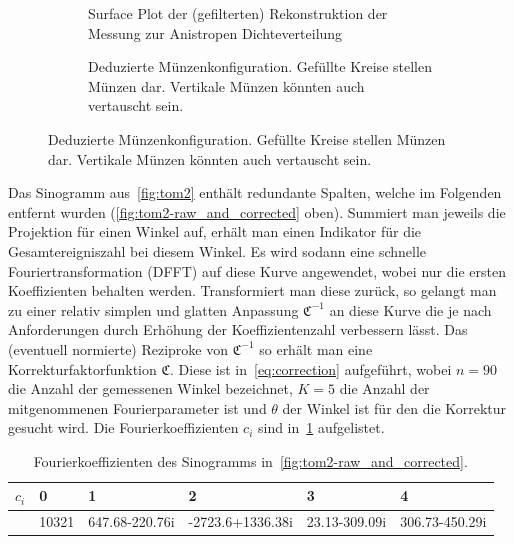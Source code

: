 \documentclass[slug=PET, room=Andreas-Schubert-Bau\,\ 424A,
supervisor=Carsten\ Bittrich, coursedate=10.\ 01.\ 2020, ngerman]{../../Lab_Report_LaTeX/lab_report}
\begin{document}
\begin{figure}[h]
 \centering
 \begin{subfigure}{.4\textwidth}
   \centering
   \resizebox{0.8\textwidth}{!}{
     
   }
   \caption{Surface Plot der (gefilterten) Rekonstruktion der Messung zur Anistropen Dichteverteilung}
   \label{fig:tom2-3dplot}
 \end{subfigure}
 \begin{subfigure}{.4\textwidth}
   \centering
   \caption[M\"unzkonfiguration]{Deduzierte
     M\"unzenkonfiguration. Gef\"ullte Kreise stellen M\"unzen
     dar. Vertikale M\"unzen k\"onnten auch vertauscht sein.}
   \label{fig:munzen}
 \end{subfigure}
\end{figure}


Das Sinogramm aus~\ref{fig:tom2} enth\"alt redundante Spalten, welche
im Folgenden entfernt wurden (\ref{fig:tom2-raw_and_corrected}
oben). Summiert man jeweils die Projektion f\"ur einen Winkel auf,
erh\"alt man einen Indikator f\"ur die Gesamtereigniszahl bei diesem
Winkel. Es wird sodann eine schnelle Fouriertransformation (DFFT) auf
diese Kurve angewendet, wobei nur die ersten Koeffizienten behalten
werden. Transformiert man diese zur\"uck, so gelangt man zu einer
relativ simplen und glatten Anpassung \(\mathfrak{C}^{-1}\) an diese
Kurve die je nach Anforderungen durch Erh\"ohung der
Koeffizientenzahl verbessern l\"asst. Das (eventuell normierte)
Reziproke von \(\mathfrak{C}^{-1}\) so erh\"alt man eine
Korrekturfaktorfunktion \(\mathfrak{C}\). Diese ist
in~\eqref{eq:correction} aufgef\"uhrt, wobei \(n=90\) die Anzahl der
gemessenen Winkel bezeichnet, \(K=5\) die Anzahl der mitgenommenen
Fourierparameter ist und \(\theta\) der Winkel ist f\"ur den die
Korrektur gesucht wird. Die Fourierkoeffizienten \(c_i\) sind
in~\ref{tab:coeff} aufgelistet.

\begin{table}[h]
  \centering
  \begin{tabular}{l|lllll}
    \toprule
    \(c_i\) & 0 & 1 & 2 & 3 & 4 \\
    \midrule
            & 10321 & 647.68-220.76i & -2723.6+1336.38i & 23.13-309.09i & 306.73-450.29i
  \end{tabular}
  \caption{Fourierkoeffizienten des Sinogramms in~\ref{fig:tom2-raw_and_corrected}.}
  \label{tab:coeff}
\end{table}
\end{document}
